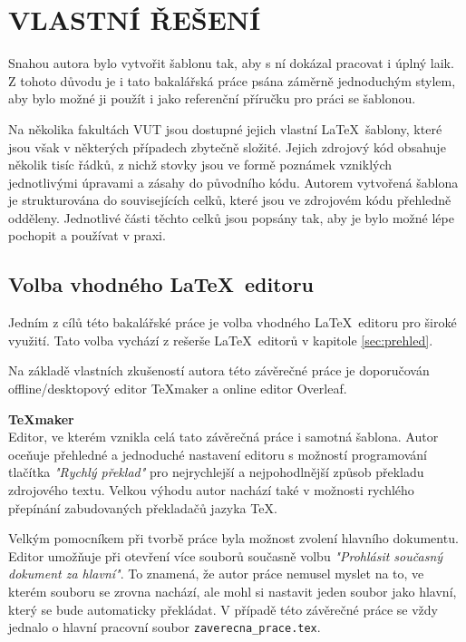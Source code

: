 
\chapter{VLASTNÍ ŘEŠENÍ}
Snahou autora bylo vytvořit šablonu tak, aby s ní dokázal pracovat i úplný laik. Z tohoto důvodu je i tato bakalářská práce psána záměrně jednoduchým stylem, aby bylo možné ji použít i jako referenční příručku pro práci se šablonou.

Na několika fakultách VUT jsou dostupné jejich vlastní \LaTeX\ šablony, které jsou však v některých případech zbytečně složité. Jejich zdrojový kód obsahuje několik tisíc řádků, z nichž stovky jsou ve formě poznámek vzniklých jednotlivými úpravami a zásahy do původního kódu. Autorem vytvořená šablona je strukturována do souvisejících celků, které jsou ve zdrojovém kódu přehledně odděleny. Jednotlivé části těchto celků jsou popsány tak, aby je bylo možné lépe pochopit a používat v praxi.



\section{Volba vhodného \LaTeX\ editoru}
Jedním z cílů této bakalářské práce je volba vhodného \LaTeX\ editoru pro široké využití. Tato volba vychází z rešerše \LaTeX\ editorů v kapitole \ref{sec:prehled}.

Na základě vlastních zkušeností autora této závěrečné práce je doporučován offline/desktopový editor \TeX maker a online editor Overleaf.

\vspace{8pt}
\textbf{\TeX maker}\\
Editor, ve kterém vznikla celá tato závěrečná práce i samotná šablona. Autor oceňuje přehledné a jednoduché nastavení editoru s možností programování tlačítka \textit{"Rychlý překlad"} pro nejrychlejší a nejpohodlnější způsob překladu zdrojového textu. Velkou výhodu autor nachází také v možnosti rychlého přepínání zabudovaných překladačů jazyka \TeX.

Velkým pomocníkem při tvorbě práce byla možnost zvolení hlavního dokumentu. Editor umožňuje při otevření více souborů současně volbu \textit{"Prohlásit současný dokument za hlavní"}. To znamená, že autor práce nemusel myslet na to, ve kterém souboru se zrovna nachází, ale mohl si nastavit jeden soubor jako hlavní, který se bude automaticky překládat. V případě této závěrečné práce se vždy jednalo o hlavní pracovní soubor \verb|zaverecna_prace.tex|.

